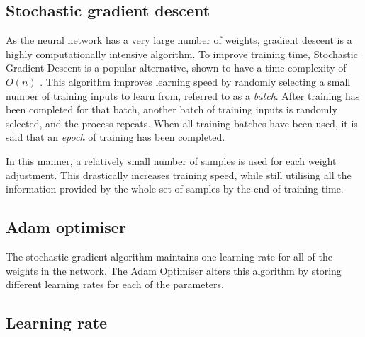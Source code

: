 \subsection*{Stochastic gradient descent}\label{nnets-stochgraddesc}

As the neural network has a very large number of weights, gradient descent is a highly computationally intensive algorithm. To improve training time, Stochastic Gradient Descent is a popular alternative, shown to have a time complexity of $O(n)$ \cite{Robbins1951}. This algorithm improves learning speed by randomly selecting a small number of training inputs to learn from, referred to as a \textit{batch}. After training has been completed for that batch, another batch of training inputs is randomly selected, and the process repeats. When all training batches have been used, it is said that an \textit{epoch} of training has been completed.

In this manner, a relatively small number of samples is used for each weight adjustment. This drastically increases training speed, while still utilising all the information provided by the whole set of samples by the end of training time.

\subsection*{Adam optimiser}\label{nnets-adam}

The stochastic gradient algorithm maintains one learning rate for all of the weights in the network. The Adam Optimiser alters this algorithm by storing different learning rates for each of the parameters. 

%
%
%

\subsection*{Learning rate}\label{nnets-learningrate}

